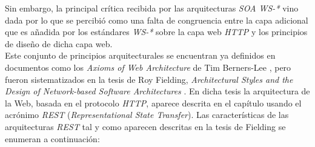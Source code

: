 Sin embargo, la principal cr\'itica recibida por las arquitecturas \textit{SOA WS-*} vino dada por lo que se percibi\'o como una falta de congruencia entre la capa adicional que es a\~nadida por los est\'andares \textit{WS-*} sobre la capa web \textit{HTTP} y los principios de dise\~no de dicha capa web.\\
Este conjunto de principios arquitecturales se encuentran ya definidos en documentos como los \textit{Axioms of Web Architecture} de Tim Berners-Lee \cite{berners1997axioms}, pero fueron sistematizados en la tesis de Roy Fielding, \textit{Architectural Styles and the Design of Network-based Software Architectures} \cite{fielding2000representational}. En dicha tesis la arquitectura de la Web, basada en el protocolo \textit{HTTP}, aparece descrita en el cap\'itulo usando el acr\'onimo \textit{REST} (\textit{Representational State Transfer}). Las caracter\'isticas de las arquitecturas \textit{REST} tal y como aparecen descritas en la tesis de Fielding se enumeran a continuaci\'on:

